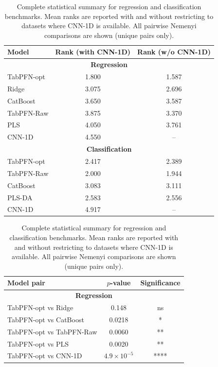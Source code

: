 \documentclass{article}
\renewcommand{\arraystretch}{1.12}
\begin{document}
\begin{table}[!htbp]
\centering
\caption{Complete statistical summary for regression and classification benchmarks. Mean ranks are reported with and without restricting to datasets where CNN-1D is available. All pairwise Nemenyi comparisons are shown (unique pairs only).}
\label{tab:cd_stats_full}
\small
\setlength{\tabcolsep}{5pt}
\renewcommand{\arraystretch}{1.2}

\begin{tabular}{lcc}
\toprule
Model & Rank (with CNN-1D) & Rank (w/o CNN-1D) \\
\midrule

\multicolumn{3}{c}{\textbf{Regression}} \\
\midrule
TabPFN-opt & 1.800 & 1.587 \\
Ridge      & 3.075 & 2.696 \\
CatBoost   & 3.650 & 3.587 \\
TabPFN-Raw & 3.875 & 3.370 \\
PLS        & 4.050 & 3.761 \\
CNN-1D     & 4.550 & -- \\

\midrule
\multicolumn{3}{c}{\textbf{Classification}} \\
\midrule
TabPFN-opt & 2.417 & 2.389 \\
TabPFN-Raw & 2.000 & 1.944 \\
CatBoost   & 3.083 & 3.111 \\
PLS-DA     & 2.583 & 2.556 \\
CNN-1D     & 4.917 & -- \\

\bottomrule
\end{tabular}

\vspace{0.8em}

\begin{tabular}{lcc}
\toprule
Model pair & $p$-value & Significance \\
\midrule

\multicolumn{3}{c}{\textbf{Regression}} \\
\midrule
TabPFN-opt vs Ridge      & 0.148 & ns \\
TabPFN-opt vs CatBoost   & 0.0218 & * \\
TabPFN-opt vs TabPFN-Raw & 0.0060 & ** \\
TabPFN-opt vs PLS        & 0.0020 & ** \\
TabPFN-opt vs CNN-1D     & $4.9 \times 10^{-5}$ & **** \\


\end{tabular}
\end{table}
\end{document}
